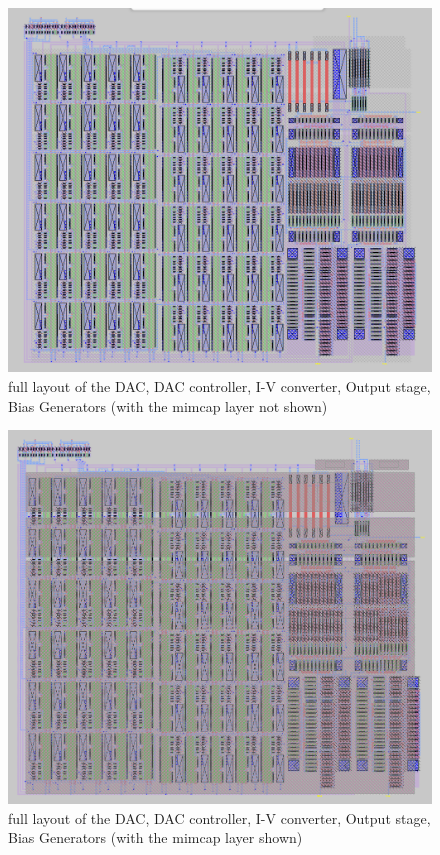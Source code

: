 \documentclass{article}
\begin{document}
\begin{figure}[H]
    \centering{}
    \includegraphics[width=0.7\columnwidth]{images/full_layout.png}
    \caption{full layout of the DAC, DAC controller, I-V converter, Output stage, Bias Generators (with the mimcap layer not shown)}
    \label{fig:opamp_schematic}
\end{figure}

\begin{figure}[H]
    \centering{}
    \includegraphics[width=0.7\columnwidth]{images/full_layout_showing_capacitors.png}
    \caption{full layout of the DAC, DAC controller, I-V converter, Output stage, Bias Generators (with the mimcap layer shown)}
    \label{fig:opamp_schematic}
\end{figure}
\end{document}
